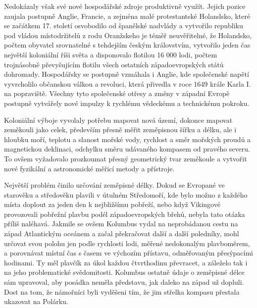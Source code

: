     Nedokázaly však své nové hospodářské zdroje produktivně využít. Jejich pozice zaujala postupně
    Anglie, Francie, a zejména malé protestantské Holandsko, které se začátkem 17. století
    osvobodilo od španělské nadvlády a vytvořilo republiku pod vládou místodržitelů z rodu
    Oranžskeho je téměř neuvěřitelné, že Holandsko, počtem obyvatel srovnatelné s tehdejším českým
    královstvím, vytvořilo jeden čas největší koloniální říši světa a disponovalo flotilou 16 000
    lodi, počtem trojnásobně převyšujícím flotilu všech ostatních západoevropských států dohromady.
    Hospodářsky se postupně vzmáhala i Anglie, kde společenské napětí vyvrcholilo občanskou válkou a
    revoluci, která přivedla v roce 1649 krále Karla I. na popraviště. Všechny tyto společenské
    otřesy a změny v západní Evropě postupně vytvářely nové impulzy k rychlému vědeckému a
    technickému pokroku.

    Koloniální výboje vyvolaly potřebu mapovat nová území, dokonce mapovat zeměkouli jako celek,
    především přesně měřit zeměpisnou šířku a délku, ale i hloubku moří, teplotu a slanost mořské
    vody, rychlost a směr mořských proudů a magnetickou deklinaci, odchylku směru udávaného kompasem
    od pravého severu. To ovšem vyžadovalo prozkoumat přesný geometrický tvar zeměkoule a vytvořit
    nové fyzikální a astronomické měřicí metody a přístroje.

    Největší problém činilo určování zeměpisné délky. Dokud se Evropané ve starověku a středověku
    plavili v útulném Středomoří, kde bylo možno z každého místa doplout za jeden den k nejbližšímu
    pobřeží, nebo když Vikingové provozovali pobřežní plavbu podél západoevropských břehů, nebyla
    tato otázka příliš naléhavá. Jakmile se ovšem Kolumbus vydal na neprobádanou cestu na západ
    Atlantickým oceánem a začal překračovat další a další poledníky, mohl určovat svou polohu jen
    podle rychlosti lodi, měřené nedokonalým plavboměrem, a porovnávat místní čas s časem ve
    výchozím přístavu, odměřovaným přesýpacími hodinami. Ty měl plavčík za úkol každou čtvrthodinu
    převracet, a záleželo tak i na jeho problematické svědomitosti. Kolumbus ostatně údaje o
    zeměpisné délce sám upravoval, aby posádka neměla představu, jak daleko na západ už dopluli.
    Dost na tom, že námořníci byli vyděšeni tím, že jim střelka kompasu přestala ukazovat na
    Polárku.

